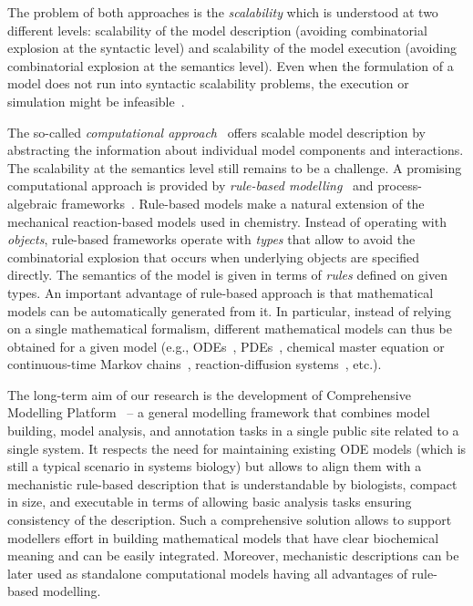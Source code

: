 \documentclass[11pt,a4paper]{report}
\begin{document}
The problem of both approaches is the \emph{scalability} which is understood at two
different levels: scalability of the model description (avoiding combinatorial explosion at the syntactic level) and scalability of the model execution (avoiding combinatorial explosion at the semantics level). Even when the formulation of a model does not run into syntactic scalability problems, the execution or simulation might be infeasible~\cite{Romers107136}. 

The so-called \emph{computational approach}~\cite{Cardelli,Henzinger} offers scalable model description by abstracting the information about individual model components and interactions. The scalability at the semantics level still remains to be a challenge. A promising computational approach is provided by \emph{rule-based modelling}~\cite{kappa_formal, BNGL} and process-algebraic frameworks~\cite{Cardelli,BioPEPA,BioSPI}. Rule-based models make a natural extension of the mechanical reaction-based models used in chemistry. Instead of operating with \emph{objects}, rule-based frameworks operate with \emph{types} that allow to avoid the combinatorial explosion that occurs when underlying objects are specified directly. The semantics of the model is given in terms of \emph{rules} defined on given types. An important advantage of rule-based approach is that mathematical models can be automatically generated from it. In particular, instead of relying on a single mathematical formalism, different mathematical models can thus be obtained for a given model (e.g., ODEs~\cite{KaDE}, PDEs~\cite{Smoldyn}, chemical master equation or continuous-time Markov chains~\cite{Pauleve2010,sneddon2011efficient}, reaction-diffusion systems~\cite{So2013}, etc.). 

The long-term aim of our research is the development of Comprehensive Modelling Platform~\cite{cs2bio2013,BCS} -- a general modelling framework that combines model building, model analysis, and annotation tasks in a single public site related to a single system. It respects the need for maintaining existing ODE models (which is still a typical scenario in systems biology) but allows to align them with a mechanistic rule-based description that is understandable by biologists, compact in size, and executable in terms of allowing basic analysis tasks ensuring consistency of the description. Such a comprehensive solution allows to support modellers effort in building mathematical models that have clear biochemical meaning and can be
easily integrated. Moreover, mechanistic descriptions can be later used as standalone computational models having all advantages of rule-based modelling. 
\end{document}
